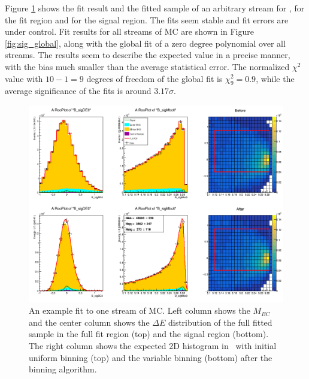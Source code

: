 Figure \ref{fig:sig_streamfit} shows the fit result and the fitted sample of an arbitrary stream for \vars, for the fit region and for the signal region. The fits seem stable and fit errors are under control. Fit results for all streams of MC are shown in Figure \ref{fig:sig_global}, along with the global fit of a zero degree polynomial over all streams. The results seem to describe the expected value in a precise manner, with the bias much smaller than the average statistical error. The normalized $\chi^2$ value with $10-1=9$ degrees of freedom of the global fit is $\chi^2_9 = 0.9$, while the average significance of the fits is around $3.17 \sigma$.

\begin{figure}[H]
	\centering
	\captionsetup{width=0.8\linewidth}
	\includegraphics[width=\linewidth]{fig/plt_uMVA1dc_0.png}
	\caption{An example fit to one stream of MC. Left column shows the $M_{BC}$ and the center column shows the $\Delta E$ distribution of the full fitted sample in the full fit region (top) and the signal region (bottom). The right column shows the expected 2D histogram in \vars~with initial uniform binning (top) and the variable binning (bottom) after the binning algorithm.}
	\label{fig:sig_streamfit}
\end{figure}


